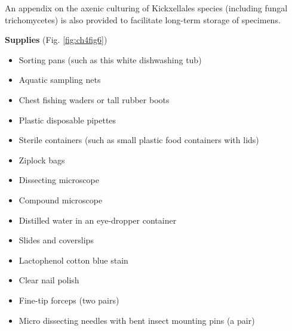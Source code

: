 \documentclass[]{book}
\providecommand{\tightlist}{%
  \setlength{\itemsep}{0pt}\setlength{\parskip}{0pt}}
\begin{document}
An appendix on the axenic culturing of Kickxellales species (including fungal trichomycetes) is also provided to facilitate long-term storage of specimens.

\textbf{Supplies }(Fig. \ref{fig:ch4fig6})

\begin{itemize}
\tightlist
\item
  Sorting pans (such as this white dishwashing tub)
\item
  Aquatic sampling nets
\item
  Chest fishing waders or tall rubber boots
\item
  Plastic disposable pipettes
\item
  Sterile containers (such as small plastic food containers with lids)
\item
  Ziplock bags
\item
  Dissecting microscope
\item
  Compound microscope
\item
  Distilled water in an eye-dropper container
\item
  Slides and coverslips
\item
  Lactophenol cotton blue stain
\item
  Clear nail polish
\item
  Fine-tip forceps (two pairs)
\item
  Micro dissecting needles with bent insect mounting pins (a pair)
\end{itemize}
\end{document}
